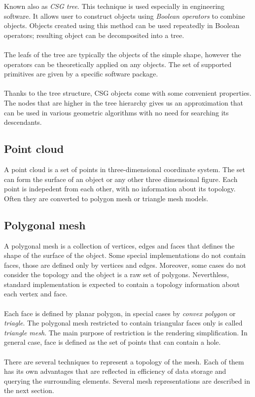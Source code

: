 Known also as \emph{CSG tree}\cite{Zara2004}. This technique is used especially
in engineering software. It allows
user to construct objects using \emph{Boolean operators} to combine objects. Objects created using this
method can be used repeatedly in Boolean operators; resulting object can be decomposited into a tree.
\\
\\
The leafs of the tree are typically the objects of the simple shape, however the operators can be
theoretically applied on any objects. The set of supported primitives are given by a specific
software package.
\\
\\
Thanks to the tree structure, CSG objects come with some convenient properties. The nodes that
are higher in the tree hierarchy gives us an approximation that can be used in various geometric
algorithms with no need for searching its descendants.

\subsection{Point cloud}

A point cloud is a set of points in three-dimensional coordinate system\cite{Agarwal2006}.
The set can form the surface
of an object or any other three dimensional figure. Each point is indepedent
from each other, with no information about its topology. Often they are converted to polygon mesh
or triangle mesh models.

\subsection{Polygonal mesh}

A polygonal mesh is a collection of vertices, edges and faces that defines the shape of the surface of
the object. Some special implementations do not contain faces, those are defined only by vertices and
edges. Moreover, some cases do not consider the topology and the object is a raw set of polygons.
Neverthless, standard implementation is expected to contain a topology information about each vertex
and face.
\\
\\
Each face is defined by planar polygon, in special cases by \emph{convex polygon} or \emph{triagle}.
The polygonal mesh restricted to contain triangular faces only is called \emph{triangle mesh}.
The main purpose of restriction is the rendering simplification. In general case, face is defined
as the set of points that can contain a hole.
\\
\\
There are several techniques to represent a topology of the mesh. Each of them has its own advantages
that are reflected in efficiency of data storage and querying the surrounding elements. Several
mesh representations are described in the next section.


